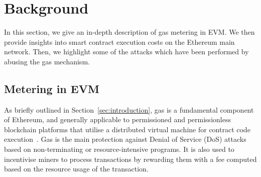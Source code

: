 \section{Background}
\label{sec:background}
In this section, we give an in-depth description of gas metering in EVM. We then provide insights into smart contract execution costs on the Ethereum main network. Then, we highlight some of the attacks which have been performed by abusing the gas mechanism.

\subsection{Metering in EVM}
As briefly outlined in Section~\ref{sec:introduction}, gas is a fundamental component of Ethereum, and generally applicable to permissioned and permissionless blockchain platforms that utilise a distributed virtual machine for contract code execution~\cite{tezos-about,eosio-about}. Gas is the main protection against Denial of Service (DoS) attacks based on non-terminating or resource-intensive programs. It is also used to incentivise miners to process transactions by rewarding them with a fee computed based on the resource usage of the transaction.

